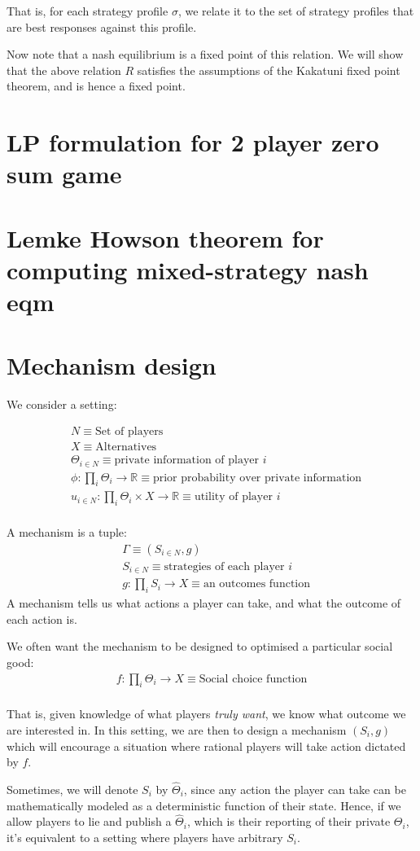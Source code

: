 \documentclass[11pt]{book}
\begin{document}
That is, for each strategy profile $\sigma$, we relate it to the set
of strategy profiles that are best responses against this profile.

Now note that a nash equilibrium is a fixed point of this relation.
We will show that the above relation $R$ satisfies the assumptions
of the Kakatuni fixed point theorem, and is hence a fixed point.


\section{LP formulation for 2 player zero sum game}
\section{Lemke Howson theorem for computing mixed-strategy nash eqm}
\section{Mechanism design}
We consider a setting:

\begin{align*}
    &N \equiv \text{Set of players} \\
    &X  \equiv \text{Alternatives} \\
    &\Theta_{i \in N} \equiv \text{private information of player $i$} \\
    &\phi: \prod_i \Theta_i \rightarrow \mathbb R \equiv \text{prior probability over private information} \\
    &u_{i \in N}: \prod_i \Theta_i \times X \rightarrow \mathbb R \equiv \text{utility of player $i$} \\
\end{align*}

A mechanism is a tuple:
\begin{align*}
    &\Gamma \equiv (S_{i \in N}, g) \\
    &S_{i \in N} \equiv \text{strategies of each player $i$} \\
    &g: \prod_i S_i \rightarrow X \equiv \text{an outcomes function}
\end{align*}
A mechanism tells us what actions a player can take, and what the outcome
of each action is.

We often want the mechanism to be designed to optimised a particular social good:
\begin{align*}
    f: \prod_i \Theta_i \rightarrow X \equiv \text{Social choice function} \\
\end{align*}

That is, given knowledge of what players \emph{truly want}, we know what
outcome we are interested in. In this setting, we are then to design 
a mechanism $(S_i, g)$ which will encourage a situation where rational players
will take action dictated by $f$.

Sometimes, we will denote $S_i$ by $\hat \Theta_i$, since any action the
player can take can be mathematically modeled as a deterministic function
of their state. Hence, if we allow players to lie and publish 
a $\hat \Theta_i$, which is their reporting of their private $\Theta_i$, it's
equivalent to a setting where players have arbitrary $S_i$.
\end{document}
